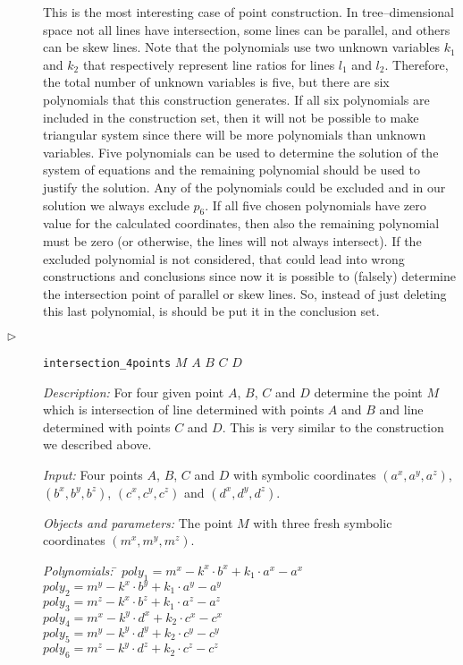 \documentclass[final,1p,times,authoryear]{elsarticle}
\begin{document}
\begin{description}
This is the most interesting case of point construction. In
tree--dimensional space not all lines have intersection, some lines
can be parallel, and others can be skew lines. Note that the
polynomials use two unknown variables $k_1$ and $k_2$ that
respectively represent line ratios for lines $l_1$ and
$l_2$. Therefore, the total number of unknown variables is five, but
there are six polynomials that this construction generates. If all six
polynomials are included in the construction set, then it will not be
possible to make triangular system since there will be more
polynomials than unknown variables. Five polynomials can be used to
determine the solution of the system of equations and the remaining
polynomial should be used to justify the solution. Any of the
polynomials could be excluded and in our solution we always exclude
$p_6$. If all five chosen polynomials have zero value for the
calculated coordinates, then also the remaining polynomial must be
zero (or otherwise, the lines will not always intersect). If the
excluded polynomial is not considered, that could lead into wrong
constructions and conclusions since now it is possible to (falsely)
determine the intersection point of parallel or skew lines. So,
instead of just deleting this last polynomial, is should be put it in
the conclusion set.

\item[$\triangleright$] {\tt intersection\_4points} $M$ $A$ $B$ $C$ $D$

  {\em Description:} For four given point $A$, $B$, $C$ and $D$
  determine the point $M$ which is intersection of line determined
  with points $A$ and $B$ and line determined with points $C$ and
  $D$. This is very similar to the construction we described above.

  {\em Input:} Four points $A$, $B$, $C$ and $D$ with symbolic
  coordinates $(a^x, a^y, a^z)$, $(b^x, b^y, b^z)$, $(c^x, c^y, c^z)$
  and $(d^x, d^y, d^z)$.

  {\em Objects and parameters:} The point $M$ with three fresh
  symbolic coordinates $(m^x, m^y, m^z)$.

\begin{tabbing}
{\em Polynomials:} \= $poly_1 = m^x - k^x\cdot b^x + k_1\cdot a^x - a^x$ \\
                   \> $poly_2 = m^y - k^x\cdot b^y + k_1\cdot a^y - a^y$ \\
                   \> $poly_3 = m^z - k^x\cdot b^z + k_1\cdot a^z - a^z$ \\
                   \> $poly_4 = m^x - k^y\cdot d^x + k_2\cdot c^x - c^x$ \\
                   \> $poly_5 = m^y - k^y\cdot d^y + k_2\cdot c^y - c^y$ \\
                   \> $poly_6 = m^z - k^y\cdot d^z + k_2\cdot c^z - c^z$
\end{tabbing}


\end{description}
\end{document}
